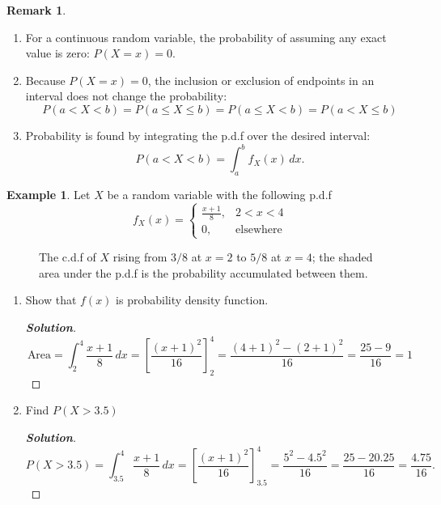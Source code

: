 \documentclass[12pt,a4paper]{report}
\theoremstyle{definition}
\newtheorem{example}[thm]{Example}
\newtheorem{remark}[thm]{Remark}
\theoremstyle{plain}
\theoremstyle{definition}
\begin{document}
\begin{remark}
\begin{enumerate}
\item  For a continuous random variable, the probability of assuming any exact value is zero: $P(X = x) = 0$.
\item Because $P(X=x) = 0$, the inclusion or exclusion of endpoints in an interval does not change the probability:\[P(a < X < b) = P(a \leq X \leq b) = P(a \leq X < b) = P(a < X \leq b)\]
\item  Probability is found by integrating the p.d.f over the desired interval: \[P(a < X < b) = \int_{a}^{b} f_X(x) \, dx.\]
\end{enumerate}
\end{remark}



\begin{example}
Let $X$ be a random variable with the following p.d.f\[f_X(x) = \begin{cases} \frac{x+1}{8}, & 2 < x < 4 \\ 0, & \text{elsewhere} \end{cases}\]
\begin{figure}[H]
\centering
{}
\caption{The c.d.f of $X$ rising from $3/8$ at $x=2$ to $5/8$ at $x=4$; the shaded area under the p.d.f is the probability accumulated between them.}
\end{figure}


\begin{enumerate}
\item[(i).] Show that $f(x)$ is probability density function.
\begin{proof}[\textbf{\textit{Solution}}]
\[\text{Area} = \int_{2}^{4} \frac{x+1}{8} \, dx = \left[ \frac{(x+1)^2}{16} \right]_{2}^{4} = \frac{(4+1)^2 - (2+1)^2}{16} = \frac{25-9}{16} = 1\]
\end{proof}


\item[(ii).] Find $P(X>3.5)$
\begin{proof}[\textbf{\textit{Solution}}]
\[P(X > 3.5) = \int_{3.5}^{4} \frac{x+1}{8} \, dx = \left[ \frac{(x+1)^2}{16} \right]_{3.5}^{4} = \frac{5^2 - 4.5^2}{16} = \frac{25 - 20.25}{16} = \frac{4.75}{16}.\]
\end{proof}




\end{enumerate}
\end{example}
\end{document}
